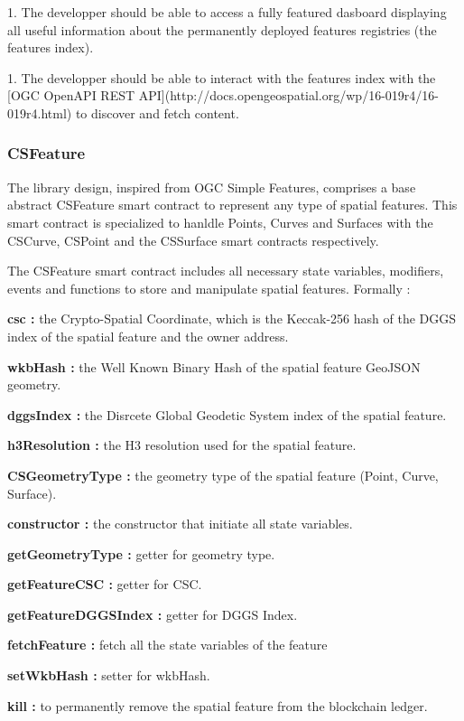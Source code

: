 \documentclass{isprs} %
\begin{document}
1. The developper should be able to access a fully featured dasboard displaying all useful information about the permanently deployed features registries (the features index).   

1. The developper should be able to interact with the features index with the [OGC OpenAPI REST API](http://docs.opengeospatial.org/wp/16-019r4/16-019r4.html) to discover and fetch content.

\subsubsection{CSFeature}\label{sec:CSFeature}

The library design, inspired from OGC Simple Features, comprises a base abstract CSFeature smart contract to represent any type of spatial features. This smart contract is specialized to hanldle Points, Curves and Surfaces with the CSCurve, CSPoint and the CSSurface smart contracts respectively.

The CSFeature smart contract includes all necessary state variables, modifiers, events and functions to store and manipulate spatial features. Formally :

\textbf{csc :} the Crypto-Spatial Coordinate, which is the Keccak-256 hash of the DGGS index of the spatial feature and the owner address.

\textbf{wkbHash :} the Well Known Binary Hash of the spatial feature GeoJSON geometry.

\textbf{dggsIndex :} the Disrcete Global Geodetic System index of the spatial feature.

\textbf{h3Resolution :} the H3 resolution used for the spatial feature.

\textbf{CSGeometryType :} the geometry type of the spatial feature (Point, Curve, Surface).

\textbf{constructor :} the constructor that initiate all state variables.

\textbf{getGeometryType :} getter for geometry type.

\textbf{getFeatureCSC :} getter for CSC.

\textbf{getFeatureDGGSIndex :} getter for DGGS Index.

\textbf{fetchFeature :} fetch all the state variables of the feature

\textbf{setWkbHash :} setter for wkbHash.

\textbf{kill :} to permanently remove the spatial feature from the blockchain ledger.
\end{document}
